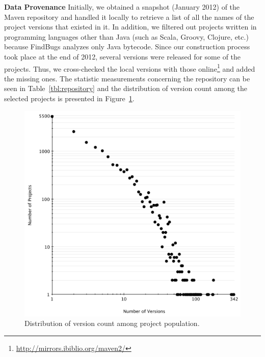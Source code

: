 \documentclass{sig-alternate}
\begin{document}
{\bf Data Provenance} Initially, we obtained a snapshot
(January 2012) of the Maven repository and handled it
locally to retrieve a list
of all the names of the project versions that existed in
it. In addition, we filtered out projects written in programming
languages other than Java (such as Scala, Groovy, Clojure, etc.)
because FindBugs analyzes only Java bytecode.
Since our construction process took place at the end of 2012,
several versions were released for some of the projects.
Thus, we cross-checked
the local versions with those online\footnote{\url{http://mirrors.ibiblio.org/maven2/}}
and added the missing ones.
The statistic measurements concerning
the repository can be seen in Table~\ref{tbl:repository}
and the distribution of version
count among the selected projects is
presented in Figure~\ref{fig:version-count}.

\begin{figure}[t]
	\centering
	\includegraphics[scale=0.37]{version_count.pdf}
	\caption{Distribution of version count among project population.}
	\label{fig:version-count}
\end{figure}



\end{document}

